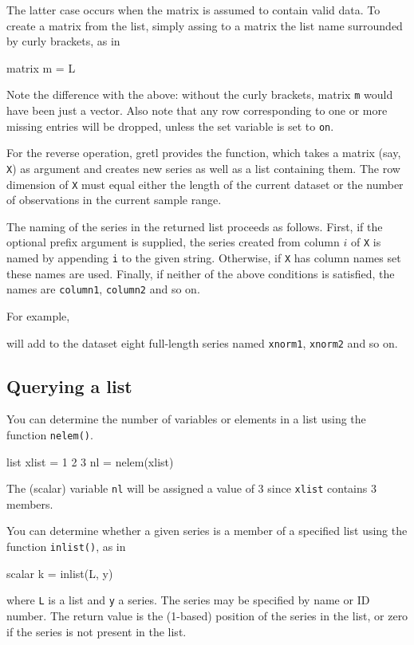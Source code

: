 The latter case occurs when the matrix is assumed to contain valid
data. To create a matrix from the list, simply assing to a matrix the
list name surrounded by curly brackets, as in
%
\begin{code}
matrix m = { L }
\end{code}
%
Note the difference with the above: without the curly brackets, matrix
\texttt{m} would have been just a vector. Also note that any row
corresponding to one or more missing entries will be dropped, unless
the  set variable is set to \texttt{on}.

For the reverse operation, gretl provides the  function,
which takes a matrix (say, \texttt{X}) as argument and creates new
series as well as a list containing them.  The row dimension of
\texttt{X} must equal either the length of the current dataset or the
number of observations in the current sample range.

The naming of the series in the returned list proceeds as
follows. First, if the optional prefix argument is supplied, the
series created from column $i$ of \texttt{X} is named by appending
\texttt{i} to the given string. Otherwise, if \texttt{X} has column
names set these names are used. Finally, if neither of the above
conditions is satisfied, the names are \texttt{column1},
\texttt{column2} and so on.

For example,
will add to the dataset eight full-length series named
\texttt{xnorm1}, \texttt{xnorm2} and so on.

\subsection{Querying a list}

You can determine the number of variables or elements in a list
using the function \texttt{nelem()}.
%
\begin{code}
list xlist = 1 2 3
nl = nelem(xlist)
\end{code}

The (scalar) variable \texttt{nl} will be assigned a value of 3 since
\texttt{xlist} contains 3 members.

You can determine whether a given series is a member of a specified
list using the function \texttt{inlist()}, as in
%
\begin{code}
scalar k = inlist(L, y)
\end{code}
%
where \texttt{L} is a list and \texttt{y} a series. The series may
be specified by name or ID number. The return value is the (1-based)
position of the series in the list, or zero if the series is not
present in the list. 


